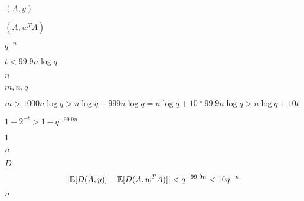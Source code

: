 \documentclass[10pt]{book}
\begin{document}
\begin{mdSnippets}
\begin{mdInlineSnippet}[d336fe65a1b9e2baa5f2424b11c4cb7a]
$(A,y)$\end{mdInlineSnippet}%
\begin{mdInlineSnippet}[5050a933f01199553251bbff2770209a]%
$(A,w^T A)$\end{mdInlineSnippet}%
\begin{mdInlineSnippet}[a77b1819c5479d6f120bff2bf4754727]%
$q^{-n}$\end{mdInlineSnippet}%
\begin{mdInlineSnippet}[687794d85b5cce1c30f50f8a79633683]%
$t < 99.9 n \log q$\end{mdInlineSnippet}%
\begin{mdInlineSnippet}[7b8b965ad4bca0e41ab51de7b31363a1]%
$n$\end{mdInlineSnippet}%
\begin{mdInlineSnippet}[01117c53053a1ed6d1ec85bd0af432e2]%
$m,n,q$\end{mdInlineSnippet}%
\begin{mdInlineSnippet}[6f428cdcd2d4205b18de3a38f8a6ce76]%
$m > 1000 n \log q >  n \log q + 999 n \log q = n \log q + 10 * 99.9 n \log q > n \log q + 10 t$\end{mdInlineSnippet}%
\begin{mdInlineSnippet}%
$1 - 2^{-t} > 1 - q^{-99.9 n}$\end{mdInlineSnippet}%
\begin{mdInlineSnippet}[c4ca4238a0b923820dcc509a6f75849b]%
$1$\end{mdInlineSnippet}%
\begin{mdInlineSnippet}[7b8b965ad4bca0e41ab51de7b31363a1]%
$n$\end{mdInlineSnippet}%
\begin{mdInlineSnippet}[f623e75af30e62bbd73d6df5b50bb7b5]%
$D$\end{mdInlineSnippet}%
\begin{mdDisplaySnippet}%
\[%
|\E[D(A,y)] - \E[D(A,w^T A)]| < q^{-99.9 n} < 10 q^{-n}
\]%
\end{mdDisplaySnippet}%
\begin{mdInlineSnippet}[7b8b965ad4bca0e41ab51de7b31363a1]%
$n$\end{mdInlineSnippet}%

\end{mdSnippets}
\end{document}

